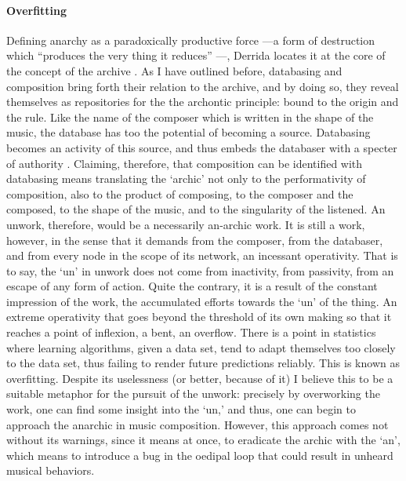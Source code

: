 \paragraph{Overfitting}
Defining anarchy as a paradoxically productive force ---a form of destruction which ``produces the very thing it reduces'' \parencite{Der95:Arc}---, Derrida locates it at the core of the concept of the archive . As I have outlined before, databasing and composition bring forth their relation to the archive, and by doing so, they reveal themselves as repositories for the the archontic principle: bound to the origin and the rule. Like the name of the composer which is written in the shape of the music, the database has too the potential of becoming a source. Databasing becomes an activity of this source, and thus embeds the databaser with a specter of authority . Claiming, therefore, that composition can be identified with databasing means translating the `archic' not only to the performativity of composition, also to the product of composing, to the composer and the composed, to the shape of the music, and to the singularity of the listened. An unwork, therefore, would be a necessarily an-archic work. It is still a work, however, in the sense that it demands from the composer, from the databaser, and from every node in the scope of its network, an incessant operativity. That is to say, the `un' in unwork does not come from inactivity, from passivity, from an escape of any form of action. Quite the contrary, it is a result of the constant impression of the work, the accumulated efforts towards the `un' of the thing. An extreme operativity that goes beyond the threshold of its own making so that it reaches a point of inflexion, a bent, an overflow. There is a point in statistics where learning algorithms, given a data set, tend to adapt themselves too closely to the data set, thus failing to render future predictions reliably. This is known as overfitting. Despite its uselessness (or better, because of it) I believe this to be a suitable metaphor for the pursuit of the unwork: precisely by overworking the work, one can find some insight into the `un,' and thus, one can begin to approach the anarchic in music composition. However, this approach comes not without its warnings, since it means at once, to eradicate the archic with the `an', which means to introduce a bug in the oedipal loop that could result in unheard musical behaviors.
